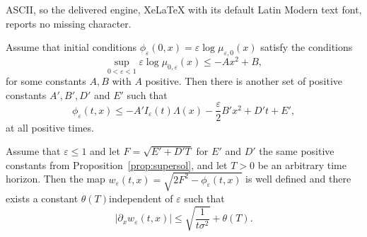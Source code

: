 \documentclass[10pt,a4paper]{amsart}
\newcommand{\eps}{\varepsilon}
\begin{document}
ASCII, so the delivered engine, XeLaTeX with its default Latin Modern text font, reports no missing character.
\begin{proposition}
\label{prop:supersol}
Assume that initial conditions $\phi_\eps(0,x)=\eps\log\mu_{\eps,0}(x)$ satisfy the conditions
$$
\sup_{0<\eps<1}\eps\log \mu_{0,\eps}(x) \leq -Ax^2+B,
$$
for some constants $A,B$ with $A$ positive. Then there is another set of positive constants $A',B',D'$ and $E'$ such that
$$
\phi_\eps(t,x)\leq -A'I_\eps(t)\Lambda(x)-\frac{\eps}2 B'x^2+D't+E',
$$ 
at all positive times.
\end{proposition}

\begin{proposition}
\label{prop:regularity_space}
Assume that $\eps\leq 1$ and let $F=\sqrt{E'+D'T}$ for $E'$ and $D'$ the same positive constants from Proposition~\ref{prop:supersol}, and let $T>0$ be an arbitrary time horizon. Then the map $w_\eps(t,x)=\sqrt{2F^2-\phi_\eps(t,x)}$ is well defined and there exists a constant $\theta(T)$independent of $\eps$ such that
$$
\left|\partial_x w_\eps(t,x)\right|\leq  \sqrt{\frac{1}{t\sigma^2}}+\theta(T).
$$
\end{proposition}
\end{document}
